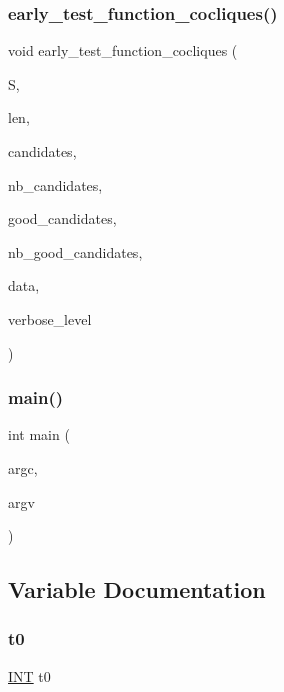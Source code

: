 \subsubsection{\texorpdfstring{early\+\_\+test\+\_\+function\+\_\+cocliques()}{early\_test\_function\_cocliques()}}
{\footnotesize\ttfamily void early\+\_\+test\+\_\+function\+\_\+cocliques (\begin{DoxyParamCaption}\item[{\mbox{\hyperlink{galois_8h_a09fddde158a3a20bd2dcadb609de11dc}{I\+NT}} $\ast$}]{S,  }\item[{\mbox{\hyperlink{galois_8h_a09fddde158a3a20bd2dcadb609de11dc}{I\+NT}}}]{len,  }\item[{\mbox{\hyperlink{galois_8h_a09fddde158a3a20bd2dcadb609de11dc}{I\+NT}} $\ast$}]{candidates,  }\item[{\mbox{\hyperlink{galois_8h_a09fddde158a3a20bd2dcadb609de11dc}{I\+NT}}}]{nb\+\_\+candidates,  }\item[{\mbox{\hyperlink{galois_8h_a09fddde158a3a20bd2dcadb609de11dc}{I\+NT}} $\ast$}]{good\+\_\+candidates,  }\item[{\mbox{\hyperlink{galois_8h_a09fddde158a3a20bd2dcadb609de11dc}{I\+NT}} \&}]{nb\+\_\+good\+\_\+candidates,  }\item[{void $\ast$}]{data,  }\item[{\mbox{\hyperlink{galois_8h_a09fddde158a3a20bd2dcadb609de11dc}{I\+NT}}}]{verbose\+\_\+level }\end{DoxyParamCaption})}

\mbox{\label{draw__colored__graph_8_c_a3c04138a5bfe5d72780bb7e82a18e627}} 
\subsubsection{\texorpdfstring{main()}{main()}}
{\footnotesize\ttfamily int main (\begin{DoxyParamCaption}\item[{int}]{argc,  }\item[{char $\ast$$\ast$}]{argv }\end{DoxyParamCaption})}



\subsection{Variable Documentation}
\mbox{\label{draw__colored__graph_8_c_a4268f4fe222ffb119218a0199f5e1904}} 
\subsubsection{\texorpdfstring{t0}{t0}}
{\footnotesize\ttfamily \mbox{\hyperlink{galois_8h_a09fddde158a3a20bd2dcadb609de11dc}{I\+NT}} t0}

